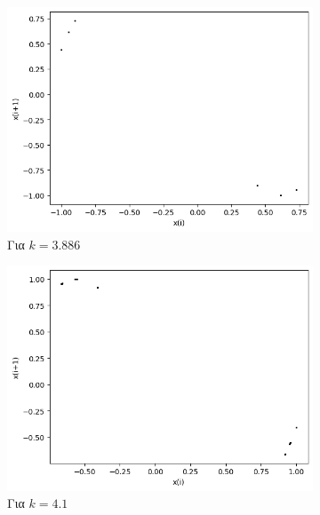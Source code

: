 \begin{figure}[ht]
\begin{subfigure}[b]{0.4\textwidth}
		\includegraphics[width=\textwidth]{LateX images/cheb q=0.8/g12}
		\caption{Για $k=3.886$}
		\label{f:k139}
	\end{subfigure}
	\hfill
	\begin{subfigure}[b]{0.4\textwidth}
		\centering
		\includegraphics[width=\textwidth]{LateX images/cheb q=0.8/g13}
		\caption{Για $k=4.1$}
		\label{f:k140}
	\end{subfigure}
	\hfill
	\begin{subfigure}[b]{0.4\textwidth}
		\centering

\end{subfigure}
\end{figure}
